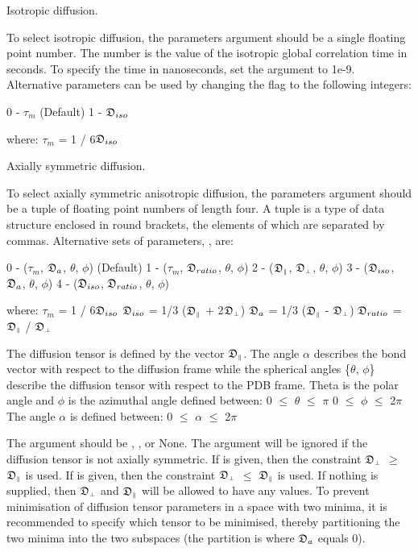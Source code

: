 Isotropic diffusion.

To select isotropic diffusion, the parameters argument should be a single floating point
number.  The number is the value of the isotropic global correlation time in seconds.  To
specify the time in nanoseconds, set the 
 argument to 1e-9.  Alternative
parameters can be used by changing the 
 flag to the following integers:

    0 - $\tau_m$   (Default)
    1 - $\mathfrak{D}_{iso}$

where:
    $\tau_m$ = 1 / 6$\mathfrak{D}_{iso}$


Axially symmetric diffusion.

To select axially symmetric anisotropic diffusion, the parameters argument should be a tuple
of floating point numbers of length four.  A tuple is a type of data structure enclosed in
round brackets, the elements of which are separated by commas.  Alternative sets of
parameters, 
, are:

    0 - ($\tau_m$, $\mathfrak{D}_a$, $\theta$, $\phi$)   (Default)
    1 - ($\tau_m$, $\mathfrak{D}_{ratio}$, $\theta$, $\phi$)
    2 - ($\mathfrak{D}_{\scriptscriptstyle \parallel}$, $\mathfrak{D}_{\scriptscriptstyle \perp}$, $\theta$, $\phi$)
    3 - ($\mathfrak{D}_{iso}$, $\mathfrak{D}_a$, $\theta$, $\phi$)
    4 - ($\mathfrak{D}_{iso}$, $\mathfrak{D}_{ratio}$, $\theta$, $\phi$)

where:
    $\tau_m$ = 1 / 6$\mathfrak{D}_{iso}$
    $\mathfrak{D}_{iso}$ = 1/3 ($\mathfrak{D}_{\scriptscriptstyle \parallel}$ + 2$\mathfrak{D}_{\scriptscriptstyle \perp}$)
    $\mathfrak{D}_a$ = 1/3 ($\mathfrak{D}_{\scriptscriptstyle \parallel}$ - $\mathfrak{D}_{\scriptscriptstyle \perp}$)
    $\mathfrak{D}_{ratio}$ = $\mathfrak{D}_{\scriptscriptstyle \parallel}$ / $\mathfrak{D}_{\scriptscriptstyle \perp}$

The diffusion tensor is defined by the vector $\mathfrak{D}_{\scriptscriptstyle \parallel}$.  The angle $\alpha$ describes the bond
vector with respect to the diffusion frame while the spherical angles \{$\theta$, $\phi$\} describe
the diffusion tensor with respect to the PDB frame.  Theta is the polar angle and $\phi$ is the
azimuthal angle defined between:
    0 $\le$ $\theta$ $\le$ $\pi$
    0 $\le$ $\phi$ $\le$ 2$\pi$
The angle $\alpha$ is defined between:
    0 $\le$ $\alpha$ $\le$ 2$\pi$

The 
 argument should be 
, 
, or None.  The argument will be
ignored if the diffusion tensor is not axially symmetric.  If 
 is given, then the
constraint $\mathfrak{D}_{\scriptscriptstyle \perp}$ $\ge$ $\mathfrak{D}_{\scriptscriptstyle \parallel}$ is used.  If 
 is given, then the constraint $\mathfrak{D}_{\scriptscriptstyle \perp}$ $\le$ $\mathfrak{D}_{\scriptscriptstyle \parallel}$ is
used.  If nothing is supplied, then $\mathfrak{D}_{\scriptscriptstyle \perp}$ and $\mathfrak{D}_{\scriptscriptstyle \parallel}$ will be allowed to have any values.  To
prevent minimisation of diffusion tensor parameters in a space with two minima, it is
recommended to specify which tensor to be minimised, thereby partitioning the two minima
into the two subspaces (the partition is where $\mathfrak{D}_a$ equals 0).



